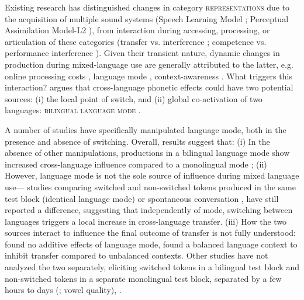 \documentclass[12 pt]{article}
\begin{document}
Existing research has distinguished changes in category \textsc{representations} due to the acquisition of multiple sound systems (Speech Learning Model \citep{flege1995second,flege2007language}; Perceptual Assimilation Model-L2 \citep{best2007nonnative}), from interaction during accessing, processing, or articulation of these categories (transfer vs. interference \citep{grosjean2012attempt}; competence vs. performance interference \citep{paradis1993linguistic}). 
Given their transient nature, dynamic changes in production during mixed-language use are generally attributed to the latter, e.g. online processing costs \citep[][VOT]{olson2013bilingual,tsui2019impact,vsimavckova2015immediate}, language mode \citep[][vowel quality]{simonet2014phonetic}, context-awareness \citep[][phonological variables]{khattab2013phonetic}. What triggers this interaction? \cite{olson2016role} argues that cross-language phonetic effects could have two potential sources: (i) the local point of switch, and (ii) global co-activation of two languages: \textsc{bilingual language mode} \citep{grosjean1998studying}.

A number of studies have specifically manipulated language mode, both in the presence and absence of switching. Overall, results suggest that: (i) In the absence of other manipulations, productions in a bilingual language mode show increased cross-language influence compared to a monolingual mode \citep[][vowel quality]{simonet2020increased,simonet2014phonetic}; (ii) However, language mode is not the sole source of influence during mixed language use--- studies comparing switched and non-switched tokens produced in the same test block (identical language mode) \citep[][VOT]{olson2016role,tsui2019impact} or spontaneous conversation \citep[][VOT]{piccinini2015voice}, have still reported a difference, suggesting that independently of mode, switching between languages triggers a local increase in cross-language transfer. (iii) How the two sources interact to influence the final outcome of transfer is not fully understood: \cite[][VOT]{olson2016role} found no additive effects of language mode, \cite[][VOT]{olson2013bilingual} found a balanced language context to inhibit transfer compared to unbalanced contexts.  Other studies have not analyzed the two separately, eliciting switched tokens in a bilingual test block and non-switched tokens in a separate monolingual test block, separated by a few hours to days (\cite{elias2017effects}; vowel quality), \citep[][VOT]{schwartz2015language, bullock2009trying,antoniou2011inter, vsimavckova2015immediate,vsimavckova2018patterns}.
\end{document}
